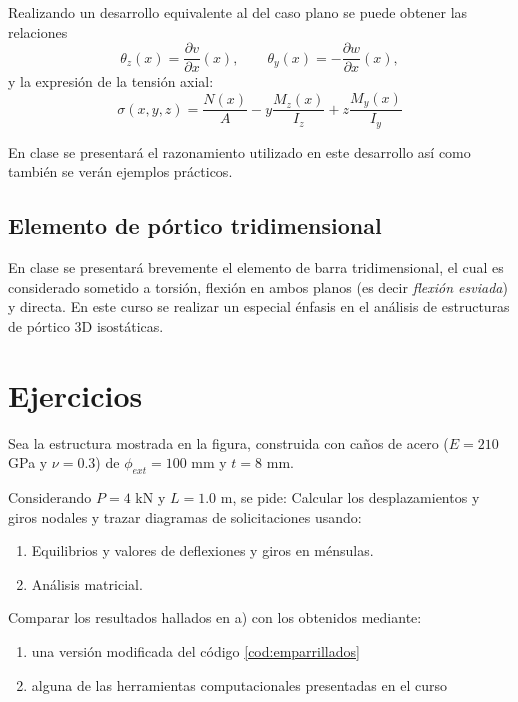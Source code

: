Realizando un desarrollo equivalente al del caso plano se puede obtener las relaciones 
%
\begin{equation}
 \theta_z(x) = \frac{\partial v}{\partial x}(x), \qquad  \theta_y(x) = - \frac{\partial w}{\partial x}(x),
\end{equation}
%
y la expresión de la tensión axial:
%
\begin{equation}\label{eqn:tensaxiflexesv}
\boxed{
	\sigma(x,y,z) = \frac{	N (x) }{A}
	- y \frac{	M_z (x) }{I_z} + z \frac{	M_y (x) }{I_y} 
}
\end{equation}

En clase se presentará el razonamiento utilizado en este desarrollo así como también se verán ejemplos prácticos.




\subsection{Elemento de pórtico tridimensional}

En clase se presentará brevemente el elemento de barra tridimensional, el cual es considerado sometido a torsión, flexión en ambos planos (es decir \textit{flexión esviada}) y directa. %
%
En este curso se realizar un especial énfasis en el análisis de estructuras de pórtico 3D isostáticas.

\section{Ejercicios}
\setcounter{ejercicio}{0}

\ejercicio

Sea la estructura mostrada en la figura, construida con caños de acero ($E=210$ GPa y $\nu =0.3$) de $\phi_{ext} = 100$ mm y $t=8$ mm.

\begin{center}
	\def\svgwidth{0.5\textwidth}
	
\end{center}

Considerando $P=4$ kN y $L=1.0$ m, se pide:
%
\parte Calcular los desplazamientos y giros nodales y trazar diagramas de solicitaciones usando:
\begin{enumerate}
\item Equilibrios y valores de deflexiones y giros en ménsulas. 
\item Análisis matricial.
\end{enumerate}
\parte Comparar los resultados hallados en a) con los obtenidos mediante:
  \begin{enumerate}
   \item una versión modificada del código \ref{cod:emparrillados}
  \item alguna de las herramientas computacionales presentadas en el curso
  \end{enumerate}


